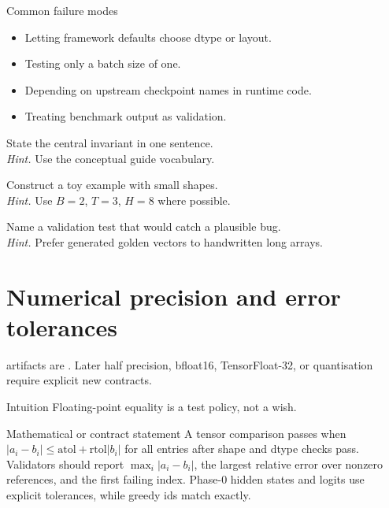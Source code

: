 \begin{warningbox}{Common failure modes}
\begin{itemize}
\item Letting framework defaults choose dtype or layout.
\item Testing only a batch size of one.
\item Depending on upstream checkpoint names in runtime code.
\item Treating benchmark output as validation.
\end{itemize}
\end{warningbox}

\begin{chapterexercises}
\item State the central invariant in one sentence.\\
\textit{Hint.} Use the conceptual guide vocabulary.
\item Construct a toy example with small shapes.\\
\textit{Hint.} Use $B=2$, $T=3$, $H=8$ where possible.
\item Name a validation test that would catch a plausible bug.\\
\textit{Hint.} Prefer generated golden vectors to handwritten long arrays.
\end{chapterexercises}

\chapter{Numerical precision and error tolerances}
\label{ch:precision}
\phasezero{} artifacts are . Later half precision, bfloat16, TensorFloat-32, or quantisation require explicit new contracts.



\begin{intuitionbox}{Intuition}
Floating-point equality is a test policy, not a wish.
\end{intuitionbox}

\begin{definitionbox}{Mathematical or contract statement}
A tensor comparison passes when \(|a_i-b_i|\leq \text{atol}+\text{rtol}|b_i|\) for all entries after shape and dtype checks pass. Validators should report \(\max_i |a_i-b_i|\), the largest relative error over nonzero references, and the first failing index. Phase-0 hidden states and logits use explicit tolerances, while greedy ids match exactly.
\end{definitionbox}

